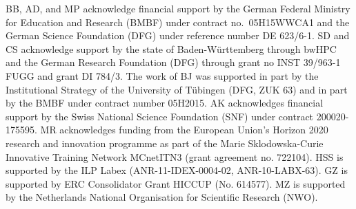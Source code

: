 \documentclass[twocolumn,epjc3]{svjour3} %
\begin{document}
BB, AD, and MP acknowledge financial support by the
German Federal Ministry for Education and Research (BMBF) under
contract no.~05H15WWCA1 and the German Science Foundation (DFG) under
reference number DE 623/6-1.
SD and CS acknowledge support by the state of Baden-W\"urttemberg through bwHPC and the German Research Foundation (DFG) through grant no INST 39/963-1 FUGG and grant DI 784/3.
The work of BJ was supported in part by the Institutional Strategy of the University of T\"ubingen (DFG, ZUK 63) and in part by
the BMBF under contract number 05H2015.
AK acknowledges financial support by the Swiss National Science Foundation (SNF) under contract 200020-175595.
MR acknowledges funding from the European Union's Horizon 2020 research and innovation programme as part of the Marie Sklodowska-Curie Innovative Training Network MCnetITN3 (grant agreement no. 722104).
HSS is supported by the ILP Labex (ANR-11-IDEX-0004-02, ANR-10-LABX-63).
GZ is supported by ERC Consolidator Grant HICCUP (No. 614577).
MZ is supported by the Netherlands National Organisation for Scientific Research (NWO).



\end{document}
